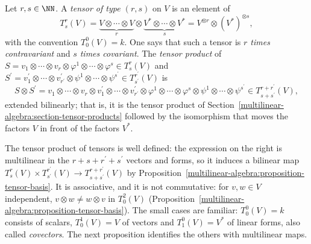 \begin{definition}\label{multilinear-algebra:definition-tensor-type}
Let $r, s \in \NN$. A \emph{tensor of type $(r,s)$} on $V$ is an element of
\[
T^r_s(V) = \underbrace{V \otimes \cdots \otimes V}_{r} \otimes \underbrace{V^* \otimes \cdots \otimes V^*}_{s} = V^{\otimes r} \otimes (V^*)^{\otimes s},
\]
with the convention $T^0_0(V) = k$. One says that such a tensor is \emph{$r$ times contravariant} and \emph{$s$ times covariant}. The \emph{tensor product} of
$S = v_1 \otimes \cdots \otimes v_r \otimes \varphi^1 \otimes \cdots \otimes \varphi^s \in T^r_s(V)$ and $S^{\prime} = v^{\prime}_1 \otimes \cdots \otimes v^{\prime}_{r^{\prime}}
\otimes \psi^1 \otimes \cdots \otimes \psi^{s^{\prime}} \in T^{r^{\prime}}_{s^{\prime}}(V)$ is
\[
S \otimes S^{\prime} = v_1 \otimes \cdots \otimes v_r \otimes v^{\prime}_1 \otimes \cdots \otimes v^{\prime}_{r^{\prime}} \otimes \varphi^1 \otimes \cdots \otimes \varphi^s \otimes \psi^1 \otimes \cdots
\otimes \psi^{s^{\prime}} \in T^{r + r^{\prime}}_{s + s^{\prime}}(V),
\]
extended bilinearly; that is, it is the tensor product of Section~\ref{multilinear-algebra:section-tensor-products} followed by the isomorphism that moves the
factors $V$ in front of the factors $V^*$.
\end{definition}

The tensor product of tensors is well defined: the expression on the right is multilinear in the $r + s + r^{\prime} + s^{\prime}$ vectors and forms, so it induces a
bilinear map $T^r_s(V) \times T^{r^{\prime}}_{s^{\prime}}(V) \to T^{r + r^{\prime}}_{s + s^{\prime}}(V)$ by Proposition~\ref{multilinear-algebra:proposition-tensor-basis}. It is associative,
and it is not commutative: for $v, w \in V$ independent, $v \otimes w \neq w \otimes v$ in $T^2_0(V)$ (Proposition~\ref{multilinear-algebra:proposition-tensor-basis}).
The small cases are familiar: $T^0_0(V) = k$ consists of scalars, $T^1_0(V) = V$ of vectors and $T^0_1(V) = V^*$ of linear forms, also called \emph{covectors}.
The next proposition identifies the others with multilinear maps.

